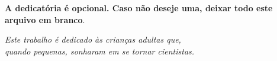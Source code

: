 
\begin{dedicatoria}
   \vspace*{\fill}
   \centering
   \noindent
	\textbf{A dedicatória é opcional. Caso não deseje uma, deixar todo este
	arquivo em branco}.

   \textit{Este trabalho é dedicado às crianças adultas que,\\
   quando pequenas, sonharam em se tornar cientistas.} \vspace*{\fill}
\end{dedicatoria}
